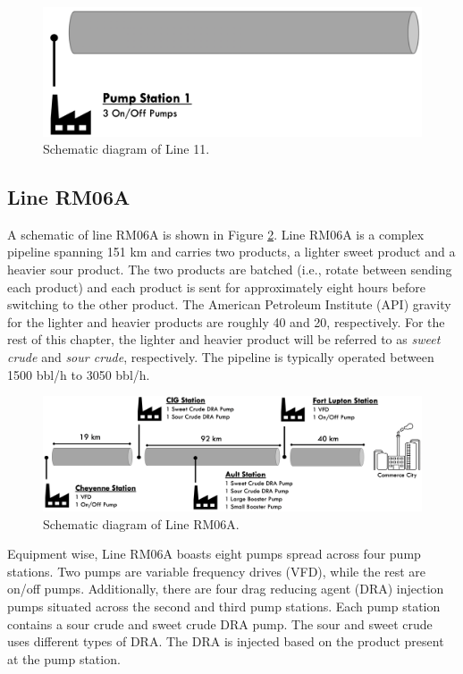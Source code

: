 \begin{figure}[h]
    \centering
    \includegraphics[scale=0.45]{images/08Line11.png}
    \caption{Schematic diagram of Line 11.}
    \label{fig:08Line11}
\end{figure}


\subsection{Line RM06A}
A schematic of line RM06A is shown in Figure \ref{fig:08RM06A}.  Line RM06A is a complex pipeline spanning 151 km and carries two products, a lighter sweet product and a heavier sour product. The two products are batched (i.e., rotate between sending each product) and each product is sent for approximately eight hours before switching to the other product. The American Petroleum Institute (API) gravity for the lighter and heavier products are roughly 40 and 20, respectively. For the rest of this chapter, the lighter and heavier product will be referred to as \textit{sweet crude} and \textit{sour crude}, respectively. The pipeline is typically operated between 1500 bbl/h to 3050 bbl/h. 

\begin{figure}[h]
    \centering
    \includegraphics[scale=0.35]{images/08RM06A.png}
    \caption{Schematic diagram of Line RM06A.}
    \label{fig:08RM06A}
\end{figure}

Equipment wise, Line RM06A boasts eight pumps spread across four pump stations. Two pumps are variable frequency drives (VFD), while the rest are on/off pumps. Additionally, there are four drag reducing agent (DRA) injection pumps situated across the second and third pump stations. Each pump station contains a sour crude and sweet crude DRA pump. The sour and sweet crude uses different types of DRA.  The DRA is injected based on the product present at the pump station. 

